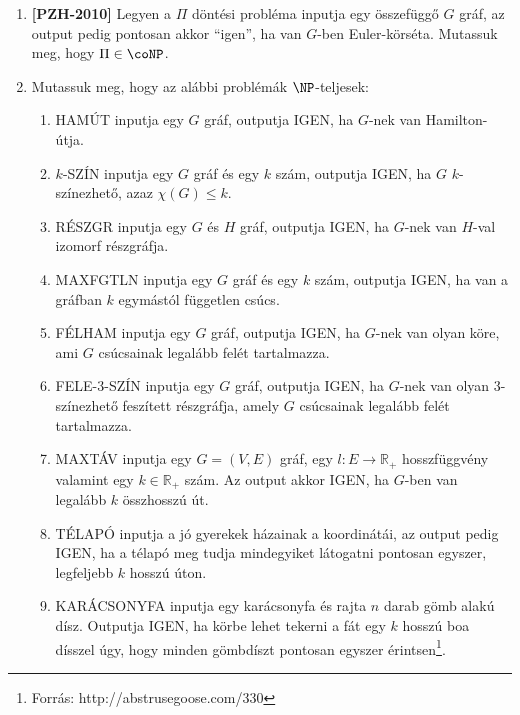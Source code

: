 \documentclass[a4paper, 12pt]{article}
\begin{document}
\begin{enumerate}
            \item \textbf{[PZH-2010]} Legyen a $\Pi$ döntési probléma inputja egy összefüggő $G$ gráf, az output pedig pontosan akkor ``igen'', ha van $G$-ben Euler-körséta. Mutassuk meg, hogy $\Pi\in\coNP$.
            \item Mutassuk meg, hogy az alábbi problémák $\NP$-teljesek:
            \begin{enumerate}
                \item HAMÚT inputja egy $G$ gráf, outputja IGEN, ha $G$-nek van Hamilton-útja.
                \item $k$-SZÍN inputja egy $G$ gráf és egy $k$ szám, outputja IGEN, ha $G$ $k$-színezhető, azaz $\chi(G)\leq k$.
                \item RÉSZGR inputja egy $G$ és $H$ gráf, outputja IGEN, ha $G$-nek van $H$-val izomorf részgráfja.
                \item MAXFGTLN inputja egy $G$ gráf és egy $k$ szám, outputja IGEN, ha van a gráfban $k$ egymástól független csúcs.
                \item FÉLHAM inputja egy $G$ gráf, outputja IGEN, ha $G$-nek van olyan köre, ami $G$ csúcsainak legalább felét tartalmazza.
                \item FELE-3-SZÍN inputja egy $G$ gráf, outputja IGEN, ha $G$-nek van olyan $3$-színezhető feszített részgráfja, amely $G$ csúcsainak legalább felét tartalmazza.
                \item MAXTÁV inputja egy $G=(V,E)$ gráf, egy $l:E\rightarrow \mathbb{R}_{+}$ hosszfüggvény valamint egy $k\in \mathbb{R}_{+}$ szám. Az output akkor IGEN, ha $G$-ben van legalább $k$ összhosszú út.
                \item TÉLAPÓ inputja a jó gyerekek házainak a koordinátái, az output pedig IGEN, ha a télapó meg tudja mindegyiket látogatni pontosan egyszer, legfeljebb $k$ hosszú úton.
                \item KARÁCSONYFA inputja egy karácsonyfa és rajta $n$ darab gömb alakú dísz. Outputja IGEN, ha körbe lehet tekerni a fát egy $k$ hosszú boa dísszel úgy, hogy minden gömbdíszt pontosan egyszer érintsen\footnote{Forrás: http://abstrusegoose.com/330}.
            \end{enumerate}
        \end{enumerate}
    
\end{document}
